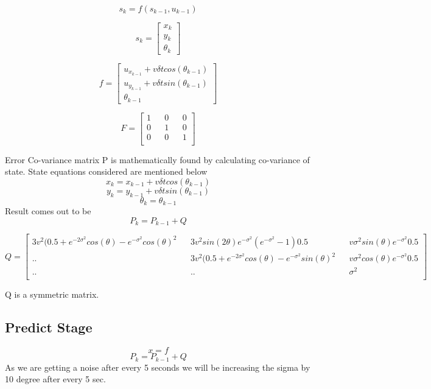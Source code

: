 \documentclass[12pt]{article}
\begin{document}
\[ s_k = f(s_{k-1}, u_{k-1})\] 

\[
s_k=
  \begin{bmatrix}
    x_k \\
    y_k \\
    \theta_k
  \end{bmatrix}
\]

\[
f=
  \begin{bmatrix}
    u_x_{k-1} + v\delta t cos(\theta_{k-1})\\
    u_y_{k-1} + v\delta t sin(\theta_{k-1}) \\
    \theta_{k-1}
  \end{bmatrix}
\]

\[
F=
  \begin{bmatrix}
    1 && 0 && 0\\
    0 && 1 && 0\\
    0 && 0 && 1\\
  \end{bmatrix}
\]



Error Co-variance matrix P is mathematically found by calculating co-variance of state.
State equations considered are mentioned below
 \[
 x_{k} =  x_{k-1} + v\delta t cos(\theta_{k-1})\]
 \[y_{k} =  y_{k-1} + v\delta t sin(\theta_{k-1})\] 
 \[\theta_{k} =   \theta_{k-1}\]
Result comes out to be
\[ P_{k} = P_{k-1} + Q\]
 
\[
Q =
  \begin{bmatrix}
    3v^2(0.5 + e^{-2\sigma^2}cos(\theta) - e^{-\sigma^2}cos(\theta)^2 && 3v^2sin(2\theta)e^{-\sigma^2}(e^{-\sigma^2} - 1)0.5 && v\sigma^2 sin(\theta) e^{-\sigma^2}0.5\\
    .. && 3v^2(0.5 + e^{-2\sigma^2}cos(\theta) - e^{-\sigma^2}sin(\theta)^2 &&  v\sigma^2 cos(\theta) e^{-\sigma^2}0.5\\
    .. && .. && \sigma^2\\
  \end{bmatrix}
\]

Q is a symmetric matrix.\\

\subsection{Predict Stage}
\[ x = f\]
\[ P_{k} = P_{k-1} + Q\]
As we are getting a noise after every 5 seconds we will be increasing the sigma by 10 degree after every 5 sec.\\
\end{document}
